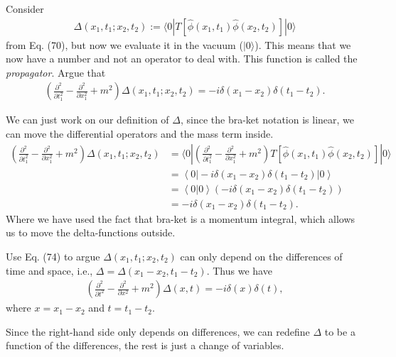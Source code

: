 \documentclass[working, oneside]{../../Preambles/tuftebook}
\begin{document}
\begin{exercise}[1]
Consider
\begin{align*}
\Delta(x_1, t_1; x_2, t_2) := \langle 0 | T \left[ \hat{\phi}(x_1, t_1) \hat{\phi}(x_2, t_2) \right] | 0 \rangle
\end{align*}
from Eq. (70), but now we evaluate it in the vacuum ($| 0 \rangle$). This means that we now have a number and not an operator to deal with. This function is called the \textit{propagator}. Argue that
\begin{align*}
\left( \frac{\partial^2}{\partial t_1^2} - \frac{\partial^2}{\partial x_1^2} + m^2 \right) \Delta(x_1, t_1; x_2, t_2) = -i \delta(x_1 - x_2) \delta(t_1 - t_2).
\end{align*}
\end{exercise}
\begin{solution}
We can just work on our definition of $\Delta$, since the bra-ket notation is linear, we can move the differential operators and the mass term inside.
\begin{align*}
    \left( \frac{\partial^2}{\partial t_1^2} - \frac{\partial^2}{\partial x_1^2} + m^2 \right) \Delta(x_1, t_1; x_2, t_2) &= \langle 0 |\left( \frac{\partial^2}{\partial t_1^2} - \frac{\partial^2}{\partial x_1^2} + m^2 \right) T \left[ \hat{\phi}(x_1, t_1) \hat{\phi}(x_2, t_2) \right] | 0 \rangle \\
    &= \left<0 \right| -i \delta(x_1 - x_2) \delta(t_1 - t_2)\left|0 \right> \\
    &= \left<0 |0 \right>(-i \delta(x_1 - x_2) \delta(t_1 - t_2))  \\
    &=-i \delta(x_1 - x_2) \delta(t_1 - t_2)
.\end{align*}
Where we have used the fact that bra-ket is a momentum integral, which allows us to move the delta-functions outside.
\color{foreground} 
\end{solution}
\begin{exercise}[2]
Use Eq. (74) to argue $\Delta(x_1, t_1; x_2, t_2)$ can only depend on the differences of time and space, i.e., $\Delta = \Delta(x_1 - x_2, t_1 - t_2)$. Thus we have
\begin{align*}
\left( \frac{\partial^2}{\partial t^2} - \frac{\partial^2}{\partial x^2} + m^2 \right) \Delta(x, t) = -i \delta(x) \delta(t),
\end{align*}
where $x = x_1 - x_2$ and $t = t_1 - t_2$.
\end{exercise}
Since the right-hand side only depends on differences, we can redefine $\Delta$ to be a function of the differences, the rest is just a change of variables.
\end{document}

